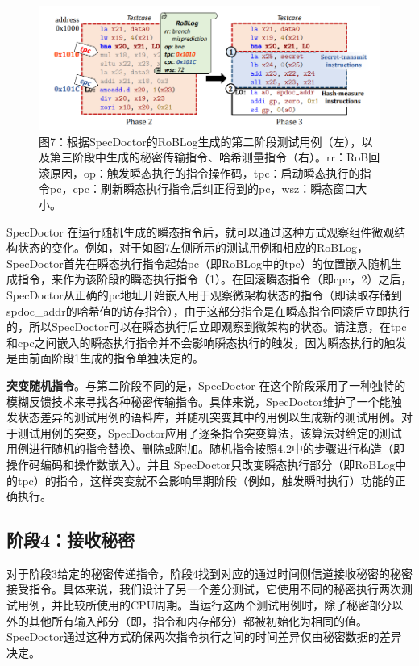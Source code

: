 \begin{figure}[!h]
    \centering
    \includegraphics[width=\linewidth]{figure/proposal/specdoctor-figure7.png}
    \caption*{图7：根据SpecDoctor的RoBLog生成的第二阶段测试用例（左），以及第三阶段中生成的秘密传输指令、哈希测量指令（右）。rr：RoB回滚原因，op：触发瞬态执行的指令操作码，tpc：启动瞬态执行的指令pc，cpc：刷新瞬态执行指令后纠正得到的pc，wsz：瞬态窗口大小。}
\end{figure}

SpecDoctor 在运行随机生成的瞬态指令后，就可以通过这种方式观察组件微观结构状态的变化。例如，对于如图7左侧所示的测试用例和相应的RoBLog，SpecDoctor首先在瞬态执行指令起始pc（即RoBLog中的tpc）的位置嵌入随机生成指令，来作为该阶段的瞬态执行指令（1）。在回滚瞬态指令（即cpc，2）之后，SpecDoctor从正确的pc地址开始嵌入用于观察微架构状态的指令（即读取存储到spdoc\_addr的哈希值的访存指令），由于这部分指令是在瞬态指令回滚后立即执行的，所以SpecDoctor可以在瞬态执行后立即观察到微架构的状态。请注意，在tpc和cpc之间嵌入的瞬态执行指令并不会影响瞬态执行的触发，因为瞬态执行的触发是由前面阶段1生成的指令单独决定的。\par

\textbf{突变随机指令}。与第二阶段不同的是，SpecDoctor 在这个阶段采用了一种独特的模糊反馈技术来寻找各种秘密传输指令。具体来说，SpecDoctor维护了一个能触发状态差异的测试用例的语料库，并随机突变其中的用例以生成新的测试用例。对于测试用例的突变，SpecDoctor应用了逐条指令突变算法，该算法对给定的测试用例进行随机的指令替换、删除或附加。随机指令按照4.2中的步骤进行构造（即操作码编码和操作数嵌入）。并且 SpecDoctor只改变瞬态执行部分（即RoBLog中的tpc）的指令，这样突变就不会影响早期阶段（例如，触发瞬时执行）功能的正确执行。\par

\subsection{阶段4：接收秘密}

对于阶段3给定的秘密传递指令，阶段4找到对应的通过时间侧信道接收秘密的秘密接受指令。具体来说，我们设计了另一个差分测试，它使用不同的秘密执行两次测试用例，并比较所使用的CPU周期。当运行这两个测试用例时，除了秘密部分以外的其他所有输入部分（即，指令和内存部分）都被初始化为相同的值。SpecDoctor通过这种方式确保两次指令执行之间的时间差异仅由秘密数据的差异决定。\par

